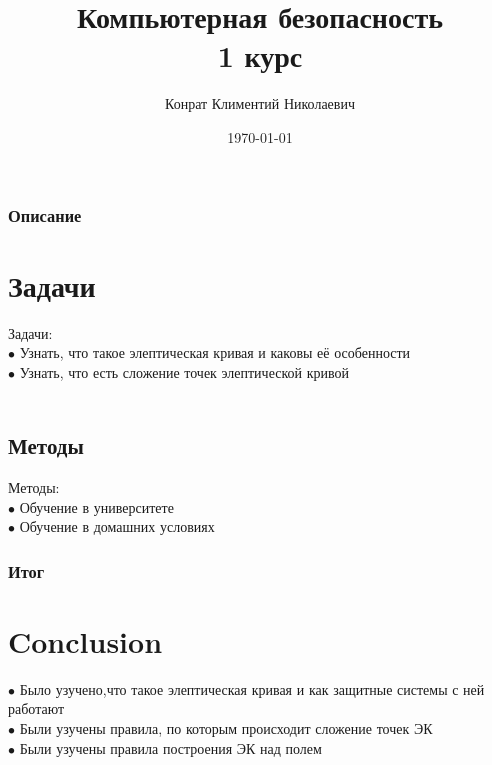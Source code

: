 \documentclass{beamer}
\title{Компьютерная безопасность \\1 курс}
\author{Конрат Климентий Николаевич}
\institute{Балтийский федеральный университет им. Иммануила Канта}
\date{\today}
\begin{document}
\begin{frame}
\titlepage
\end{frame}

\begin{frame}
\frametitle{Описание}
\section{Задачи} 
Задачи:\\
$\bullet$ Узнать, что такое элептическая кривая и каковы её особенности\\
$\bullet$ Узнать, что есть сложение точек элептической кривой\\ 
~\\
\subsection{Методы}
Методы:\\
$\bullet$ Обучение в университете\\
$\bullet$ Обучение в домашних условиях
\end{frame}

\begin{frame}
\frametitle{Итог}
\section{Conclusion}
$\bullet$ Было узучено,что такое элептическая кривая и как защитные системы с ней работают\\
$\bullet$ Были узучены правила, по которым происходит сложение точек ЭК\\
$\bullet$ Были узучены правила построения ЭК над полем\\
\end{frame}
\end{document}
